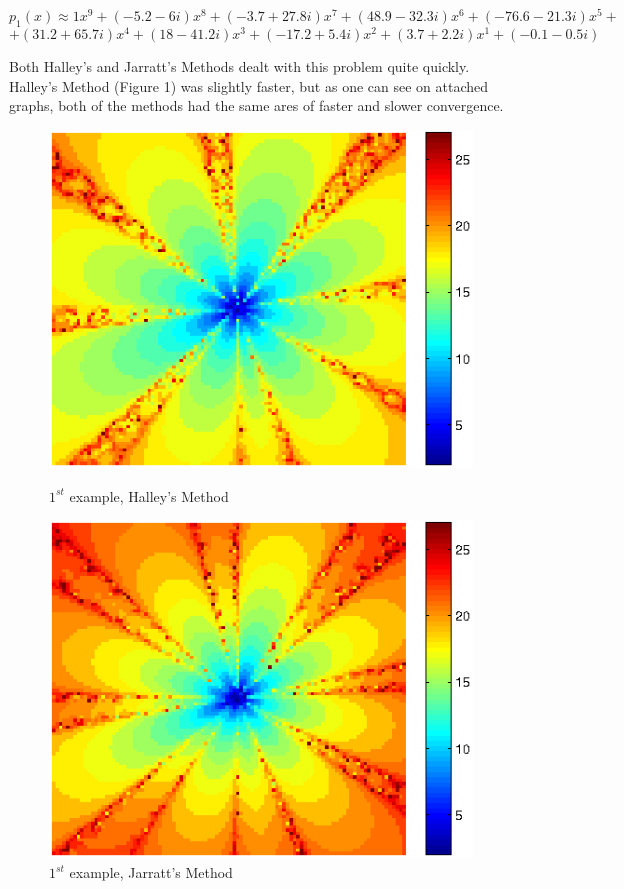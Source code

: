 \documentclass{article}
\begin{document}
\[ p_1(x) \approx 1x^9 + (-5.2-6i)x^8 + (-3.7+27.8i)x^7 + (48.9-32.3i)x^6 + (-76.6-21.3i)x^5 +\]
\[ + (31.2+65.7i)x^4 + (18-41.2i)x^3 + (-17.2+5.4i)x^2 + (3.7+2.2i)x^1 + (-0.1-0.5i) \]

Both Halley's and Jarratt's Methods dealt with this problem quite quickly. Halley's Method (Figure
1) was slightly faster, but as one can see on attached graphs, both of the methods had the same
ares of faster and slower convergence.

\begin{figure}[H]
	\begin{minipage}[b]{0.48\linewidth}
		\centering
		\includegraphics[scale=0.68]{example1halley.jpg}
		\caption{$1^{st}$ example, Halley's Method}
		\label{fig:figure1}
	\end{minipage}
	\hspace{0.5cm}
	\begin{minipage}[b]{0.48\linewidth}
		\centering
		\includegraphics[scale=0.68]{example1jarratt.jpg}
		\caption{$1^{st}$ example, Jarratt's Method}
		\label{fig:figure2}
	\end{minipage}
\end{figure}
\end{document}
